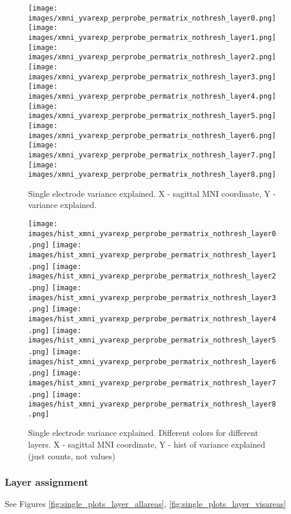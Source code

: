 \documentclass[final]{jneurosci}
\begin{document}
\begin{figure}
\centering
\texttt{[image: images/xmni\_yvarexp\_perprobe\_permatrix\_nothresh\_layer0.png]}
\texttt{[image: images/xmni\_yvarexp\_perprobe\_permatrix\_nothresh\_layer1.png]}
\texttt{[image: images/xmni\_yvarexp\_perprobe\_permatrix\_nothresh\_layer2.png]}
\texttt{[image: images/xmni\_yvarexp\_perprobe\_permatrix\_nothresh\_layer3.png]}
\texttt{[image: images/xmni\_yvarexp\_perprobe\_permatrix\_nothresh\_layer4.png]}
\texttt{[image: images/xmni\_yvarexp\_perprobe\_permatrix\_nothresh\_layer5.png]}
\texttt{[image: images/xmni\_yvarexp\_perprobe\_permatrix\_nothresh\_layer6.png]}
\texttt{[image: images/xmni\_yvarexp\_perprobe\_permatrix\_nothresh\_layer7.png]}
\texttt{[image: images/xmni\_yvarexp\_perprobe\_permatrix\_nothresh\_layer8.png]}
\caption{Single electrode variance explained. X - sagittal MNI coordinate, Y - variance explained.}
\label{fig:single_plots_variance_explained}
\end{figure}

\begin{figure}
\centering
\texttt{[image: images/hist\_xmni\_yvarexp\_perprobe\_permatrix\_nothresh\_layer0.png]}
\texttt{[image: images/hist\_xmni\_yvarexp\_perprobe\_permatrix\_nothresh\_layer1.png]}
\texttt{[image: images/hist\_xmni\_yvarexp\_perprobe\_permatrix\_nothresh\_layer2.png]}
\texttt{[image: images/hist\_xmni\_yvarexp\_perprobe\_permatrix\_nothresh\_layer3.png]}
\texttt{[image: images/hist\_xmni\_yvarexp\_perprobe\_permatrix\_nothresh\_layer4.png]}
\texttt{[image: images/hist\_xmni\_yvarexp\_perprobe\_permatrix\_nothresh\_layer5.png]}
\texttt{[image: images/hist\_xmni\_yvarexp\_perprobe\_permatrix\_nothresh\_layer6.png]}
\texttt{[image: images/hist\_xmni\_yvarexp\_perprobe\_permatrix\_nothresh\_layer7.png]}
\texttt{[image: images/hist\_xmni\_yvarexp\_perprobe\_permatrix\_nothresh\_layer8.png]}
\caption{Single electrode variance explained. Different colors for different layers. X - sagittal MNI coordinate, Y - hist of variance explained (just counts, not values)}
\label{fig:single_plots_variance_explained_hist}
\end{figure}




\subsubsection{Layer assignment}
See Figures \ref{fig:single_plots_layer_allareas}, \ref{fig:single_plots_layer_visareas}
\end{document}

